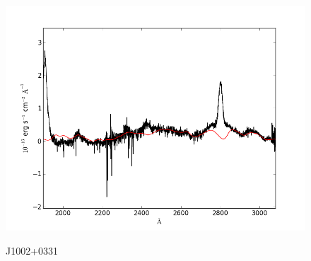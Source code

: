 \documentclass[usenatbib]{mn2e}
\begin{document}
\begin{figure}
\begin{center}
\vspace{5mm}
\includegraphics[width=0.49\linewidth,angle=0]{./red/fe_fit_SBB_9.png}\\

\end{center} 
\caption{J1002+0331 \label{fig:landscape}}   
\end{figure}

\newpage
\end{document}
